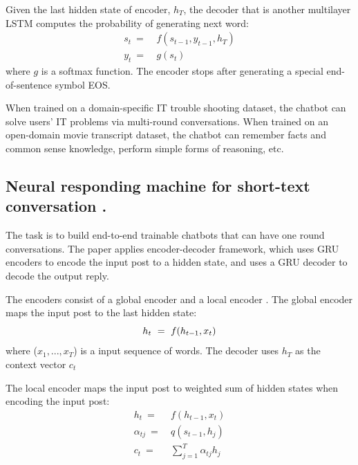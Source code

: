 \documentclass[paper=a4, fontsize=18pt]{article} %
\numberwithin{equation}{section} %
\numberwithin{figure}{section} %
\numberwithin{table}{section} %
\begin{document}
Given the last hidden state of encoder, $h_{T}$, the decoder that is another multilayer LSTM computes the probability of generating next word:
\begin{equation}
\begin{aligned}
s_{t} \ =& \ f( s_{t-1}, y_{t-1}, h_{T} ) \\
y_{t} \ =& \ g( s_{t} )
\end{aligned}
\end{equation}
where $g$ is a softmax function. The encoder stops after generating a special end-of-sentence symbol EOS.

When trained on a domain-specific IT trouble shooting dataset, the chatbot can solve users' IT problems via multi-round conversations. When trained on an open-domain movie transcript dataset, the chatbot can remember facts and common sense knowledge, perform simple forms of reasoning, etc.

\subsection{Neural responding machine for short-text conversation \cite{Shang2015Neural}.}

The task is to build end-to-end trainable chatbots that can have one round conversations. The paper applies encoder-decoder framework, which uses GRU \cite{Chung2014Empirical, Cho2014Learning} encoders to encode the input post to a hidden state, and uses a GRU decoder to decode the output reply.

The encoders consist of a global encoder \cite{Chung2014Empirical, Cho2014Learning} and a local encoder \cite{Bahdanau2014Neural, Graves2013Generating}. The global encoder maps the input post to the last hidden state:
\begin{equation}
h_{t} \ = \ f( h_{t-1}, x_{t} ) \\
\end{equation}
where ($x_{1},...,x_{T}$) is a input sequence of words. The decoder uses $h_{T}$ as the context vector $c_{t}$

The local encoder maps the input post to weighted sum of hidden states when encoding the input post:
\begin{equation}
\begin{aligned}
h_{t} \ =& \ f( h_{t-1}, x_{t} ) \\
\alpha_{tj} \ =& \ q(s_{t-1}, h_{j}) \\
c_{t} \ =& \ \sum_{j=1}^{T} \alpha_{tj}h_{j} \\
\end{aligned}
\end{equation}
\end{document}
